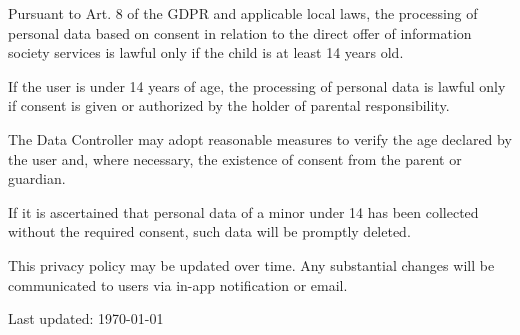 \documentclass[a4paper,12pt]{article}
\begin{document}
    Pursuant to Art. 8 of the GDPR and applicable local laws, the processing of personal data based on consent in relation to the direct offer of information society services is lawful only if the child is at least 14 years old.

    If the user is under 14 years of age, the processing of personal data is lawful only if consent is given or authorized by the holder of parental responsibility.

    The Data Controller may adopt reasonable measures to verify the age declared by the user and, where necessary, the existence of consent from the parent or guardian.

    If it is ascertained that personal data of a minor under 14 has been collected without the required consent, such data will be promptly deleted.


    This privacy policy may be updated over time.
    Any substantial changes will be communicated to users via in-app notification or email.

    \vspace{1cm}

    \noindent
    Last updated: \today
\end{document}
